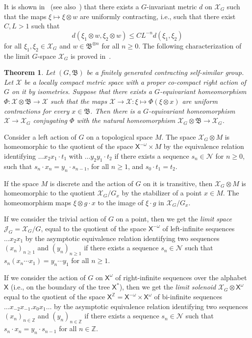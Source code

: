 \documentclass[11pt]{amsart}
\newcommand{\Z}{\ensuremath{\mathbb{Z}}}%
\newcommand{\bim}{\mathfrak{B}}
\newcommand{\arr}{\longrightarrow}
\newcommand{\lims}[1][G]{\mathcal{J}_{#1}}
\newcommand{\limg}[1][G]{\mathcal{X}_{#1}}
\newcommand{\xs}{\alb^\ast}
\newcommand{\xo}{\alb^\omega}
\newcommand{\alb}{\ensuremath{\mathsf{X}}}%
\newcommand{\nuke}{\ensuremath{\mathcal{N}}}%
\theoremstyle{definition}
\theoremstyle{plain}
\newtheorem{thm}[defin]{Theorem}
\newtheorem{main thm}{Theorem}
\theoremstyle{remark}
\theoremstyle{plain}
\begin{document}
It is shown in~\cite[Proposition~4.5.30]{nek:dyngroups} (see also~\cite[Theorem~2.11]{nek:IMGdimension}) that there exists a $G$-invariant metric $d$ on $\limg$ such that the maps $\xi\mapsto \xi\otimes w$ are uniformly contracting, i.e., such that there exist $C, L>1$ such that
\[d(\xi_1\otimes w, \xi_2\otimes w)\le CL^{-n}d(\xi_1, \xi_2)\]
for all $\xi_1, \xi_2\in\limg$ and $w\in\bim^{\otimes n}$ for all $n\ge 0$. The following characterization of the limit $G$-space $\limg$ is proved in~\cite[Theorem~3.4.13]{Nek:book}.

\begin{thm}
\label{th:uniquenessoflimg}
Let $(G, \bim)$ be a finitely generated contracting self-similar group. Let $\mathcal{X}$ be a locally compact metric space with a proper co-compact right action of $G$ on it by isometries. Suppose that there exists a $G$-equivariant homeomorphism $\Phi\colon\mathcal{X}\otimes\bim\arr\mathcal{X}$ such that the maps $\mathcal{X}\arr\mathcal{X}\colon\xi\mapsto \Phi(\xi\otimes x)$ are  uniform contractions for every $x\in\bim$. Then there is a $G$-equivariant homeomorphism $\mathcal{X}\arr\limg$ conjugating $\Phi$ with the natural homeomorphism $\limg\otimes\bim\arr\limg$.
\end{thm}


Consider a left action of $G$ on a topological space $M$. The space $\limg\otimes M$ is homeomorphic to the quotient of the space $\alb^{-\omega}\times M$ by the equivalence relation identifying $\ldots x_2x_1\cdot t_1$ with $\ldots y_2y_1\cdot t_2$ if there exists a sequence $s_n\in\nuke$ for $n\ge 0$, such that $s_n\cdot x_n=y_n\cdot s_{n-1}$, for all $n\ge 1$, and $s_0\cdot t_1=t_2$.

If the space $M$ is discrete and the action of $G$ on it is transitive, then $\limg\otimes M$ is homeomorphic to the quotient $\limg/G_x$ by the stabilizer of a point $x\in M$. The homeomorphism maps $\xi\otimes g\cdot x$ to the image of $\xi\cdot g$ in $\limg/G_x$. 

If we consider the trivial action of $G$ on a point, then we get the \emph{limit space} $\lims=\limg/G$, equal to the quotient of the space $\alb^{-\omega}$ of left-infinite sequences $\ldots x_{2}x_{1}$ by the asymptotic equivalence relation identifying two sequences $(x_{n})_{n\ge 1}$ and $(y_{n})_{n\ge 1}$ if there exists a sequence $s_n\in\nuke$ such that $s_n(x_{n}\cdots x_{1})= y_{n}\cdots y_{1}$  for all $n\ge 1$.

If we consider the action of $G$ on $\xo$ of right-infinite sequences over the alphabet $\alb$ (i.e., on the boundary of the tree $\xs$), then we get the \emph{limit solenoid} $\limg\otimes\xo$ equal to the quotient of the space $\alb^\Z=\alb^{-\omega}\times \alb^{\omega}$ of bi-infinite sequences $\ldots x_{-2}x_{-1}.x_0x_1\ldots$ by the asymptotic equivalence relation identifying two sequences $(x_n)_{n\in\Z}$ and $(y_n)_{n\in\Z}$ if there exists a sequence $s_n\in\nuke$ such that $s_n\cdot x_n=y_n\cdot s_{n-1}$ for all $n\in\Z$.
\end{document}
